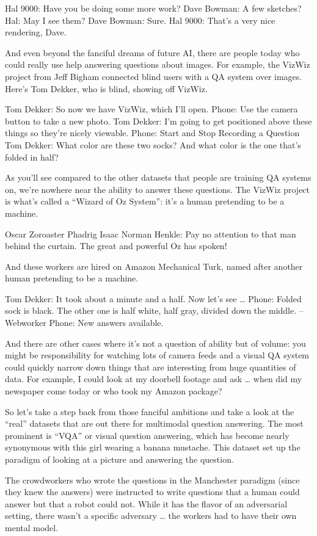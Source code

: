 Hal 9000: Have you be doing some more work?
Dave Bowman: A few sketches?
Hal: May I see them?
Dave Bowman: Sure.
Hal 9000: That’s a very nice rendering, Dave.

And even beyond the fanciful dreams of future AI, there are people today who could really use help answering questions about images.  For example, the VizWiz project from Jeff Bigham connected blind users with a QA system over images.  Here’s Tom Dekker, who is blind, showing off VizWiz.

Tom Dekker: So now we have VizWiz, which I’ll open.
Phone: Use the camera button to take a new photo.
Tom Dekker: I’m going to get positioned above these things so they’re nicely viewable.
Phone: Start and Stop Recording a Question
Tom Dekker: What color are these two socks?  And what color is the one that’s folded in half?

As you’ll see compared to the other datasets that people are training QA systems on, we’re nowhere near the ability to answer these questions.  The VizWiz project is what’s called a “Wizard of Oz System”: it’s a human pretending to be a machine.

Oscar Zoroaster Phadrig Isaac Norman Henkle: Pay no attention to that man behind the curtain.  The great and powerful Oz has spoken!

And these workers are hired on Amazon Mechanical Turk, named after another human pretending to be a machine.

Tom Dekker: It took about a minute and a half.  Now let’s see …
Phone: Folded sock is black.  The other one is half white, half gray, divided down the middle.  –Webworker
Phone: New answers available.

And there are other cases where it’s not a question of ability but of volume: you might be responsibility for watching lots of camera feeds and a visual QA system could quickly narrow down things that are interesting from huge quantities of data.  For example, I could look at my doorbell footage and ask … when did my newspaper come today or who took my Amazon package?

So let’s take a step back from those fanciful ambitions and take a look at the “real” datasets that are out there for multimodal question answering.  The most prominent is “VQA” or visual question answering, which has become nearly synonymous with this girl wearing a banana mustache.  This dataset set up the paradigm of looking at a picture and answering the question.

The crowdworkers who wrote the questions in the Manchester paradigm (since they knew the answers) were instructed to write questions that a human could answer but that a robot could not.  While it has the flavor of an adversarial setting, there wasn’t a specific adversary … the workers had to have their own mental model.

